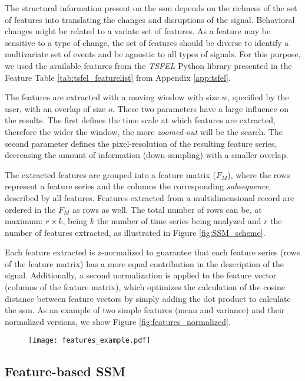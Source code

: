The structural information present on the \gls{ssm} depends on the richness of the set of features into translating the changes and disruptions of the signal. Behavioral changes might be related to a variate set of features. As a feature may be sensitive to a type of change, the set of features should be diverse to identify a multivariate set of events and be agnostic to all types of signals. For this purpose, we used the available features from the \textit{TSFEL} \cite{barandas_tsfel_2020} Python library presented in the Feature Table \ref{tab:tsfel_featurelist} from Appendix \ref{app:tsfel}.
\par
The features are extracted with a moving window with size $w$, specified by the user, with an overlap of size $o$. These two parameters have a large influence on the results. The first defines the time scale at which features are extracted, therefore the wider the window, the more \textit{zoomed-out} will be the search. The second parameter defines the pixel-resolution of the resulting feature series, decreasing the amount of information (down-sampling) with a smaller overlap.
\par
The extracted features are grouped into a feature matrix ($F_{M}$), where the rows represent a feature series and the columns the corresponding \textit{subsequence}, described by all features. Features extracted from a multidimensional record are ordered in the $F_M$ as rows as well. The total number of rows can be, at maximum: $r \times k$, being $k$ the number of time series being analyzed and $r$ the number of features extracted, as illustrated in Figure \ref{fig:SSM_scheme}.
\par
Each feature extracted is z-normalized to guarantee that each feature series (rows of the feature matrix) has a more equal contribution in the description of the signal. Additionally, a second normalization is applied to the feature vector (columns of the feature matrix), which optimizes the calculation of the cosine distance between feature vectors by simply adding the dot product to calculate the \gls{ssm}. As an example of two simple features (mean and variance) and their normalized versions, we show Figure \ref{fig:features_normalized}.

\begin{figure}
\texttt{[image: features\_example.pdf]}
\end{figure}


\subsection{Feature-based SSM}
\label{sec:the_ssm}


